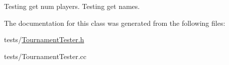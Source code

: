 Testing get num players. Testing get names. 

The documentation for this class was generated from the following files:\begin{DoxyCompactItemize}
\item 
tests/\hyperlink{TournamentTester_8h}{TournamentTester.h}\item 
tests/TournamentTester.cc\end{DoxyCompactItemize}
